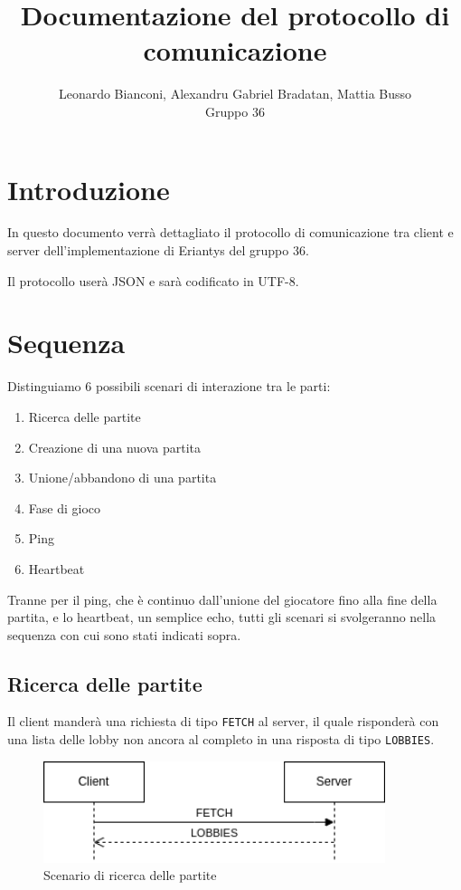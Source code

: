 \documentclass[a4paper,12pt]{article}
\title{Documentazione del protocollo di comunicazione}
\author{Leonardo Bianconi, Alexandru Gabriel Bradatan, Mattia Busso\\Gruppo 36}
\begin{document}
\maketitle
\tableofcontents

\section{Introduzione}

In questo documento verrà dettagliato il protocollo di comunicazione tra
client e server dell'implementazione di Eriantys del gruppo 36.

Il protocollo userà JSON e sarà codificato in UTF-8.

\section{Sequenza}

Distinguiamo 6 possibili scenari di interazione tra le parti:

\begin{enumerate}
\item Ricerca delle partite
\item Creazione di una nuova partita
\item Unione/abbandono di una partita
\item Fase di gioco
\item Ping
\item Heartbeat
\end{enumerate}

Tranne per il ping, che è continuo dall'unione del giocatore fino alla fine della
partita, e lo heartbeat, un semplice echo, tutti gli scenari si svolgeranno nella
sequenza con cui sono stati indicati sopra.

\subsection{Ricerca delle partite}

Il client manderà una richiesta di tipo \texttt{FETCH} al server, il quale
risponderà con una lista delle lobby non ancora al completo in una risposta
di tipo \texttt{LOBBIES}.

\begin{figure}[htb]
  \centering
  \includegraphics[width=10cm]{fetch.png}
  \caption{Scenario di ricerca delle partite}%
  \label{fig:fetch}
\end{figure}
\end{document}
